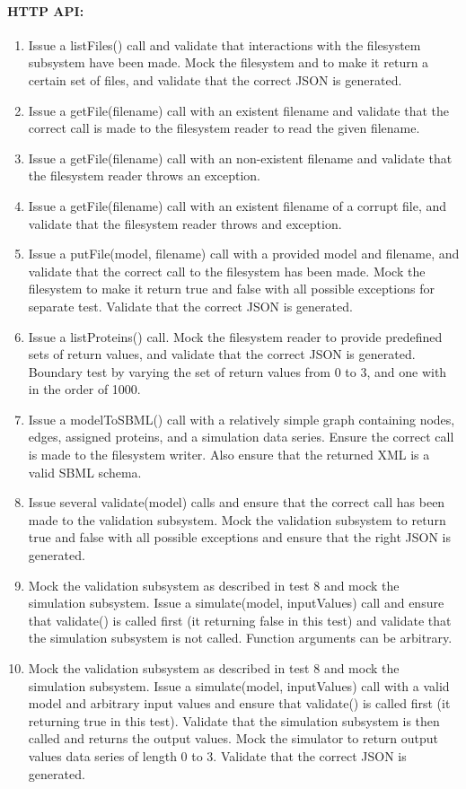 \paragraph{HTTP API:
}\begin{enumerate}
\item Issue a listFiles() call and validate that interactions with the filesystem subsystem have been made. Mock the filesystem and to make it return a certain set of files, and validate that the correct JSON is generated.
\item Issue a getFile(filename) call with an existent filename and validate that the correct call is made to the filesystem reader to read the given filename.
\item Issue a getFile(filename) call with an non-existent filename and validate that the filesystem reader throws an exception.
\item Issue a getFile(filename) call with an existent filename of a corrupt file, and validate that the filesystem reader throws and exception.
\item Issue a putFile(model, filename) call with a provided model and filename, and validate  that the correct call to the filesystem has been made. Mock the filesystem to make it return true and false with all possible exceptions for separate test. Validate that the correct JSON is generated.\item Issue a listProteins() call. Mock the filesystem reader to provide predefined sets of return values, and validate that the correct JSON is generated. Boundary test by varying the set of return values from 0 to 3, and one with in the order of 1000. \item Issue a modelToSBML() call with a relatively simple graph containing nodes, edges, assigned proteins, and a simulation data series. Ensure the correct call is made to the filesystem writer. Also ensure that the returned XML is a valid SBML schema.\item Issue several validate(model) calls and ensure that the correct call has been made to the validation subsystem. Mock the validation subsystem to return true and false with all possible exceptions and ensure that the right JSON is generated.
\item Mock the validation subsystem as described in test 8 and mock the simulation subsystem. Issue a simulate(model, inputValues) call and ensure that validate() is called first (it returning false in this test) and validate that the simulation subsystem is not called. Function arguments can be arbitrary. 
\item Mock the validation subsystem as described in test 8 and mock the simulation subsystem. Issue a simulate(model, inputValues) call with a valid model and arbitrary input values and ensure that validate() is called first (it returning true in this test). Validate that the simulation subsystem is then called and returns the output values. Mock the simulator to return output values data series of length 0 to 3. Validate that the correct JSON is generated.\end{enumerate}
